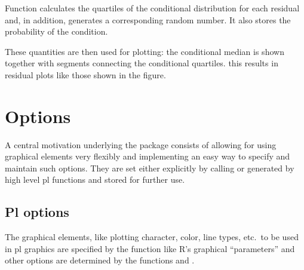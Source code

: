 \documentclass[11pt]{article}\usepackage[]{graphicx}\usepackage[]{color}
\begin{document}
Function  calculates the quartiles of the conditional
distribution for each residual and, in addition, generates a corresponding
random number. It also stores the probability of the condition.

These quantities are then used for plotting: the conditional median is 
shown together with segments connecting the conditional quartiles.
this results in residual plots like those shown in the figure.



\section{Options}
A central motivation underlying the  package consists of
allowing for using graphical elements very flexibly and implementing an
easy way to specify and maintain such options.
They are set either explicitly by calling  or generated
by high level pl functions and stored for further use.

\subsection{Pl options}
The graphical elements, like plotting character, color, line types, etc.\ 
to be used in pl graphics are specified by the function 
like R's graphical ``parameters'' and other options are determined by the
functions \T{par} and \T{options}.
\end{document}
